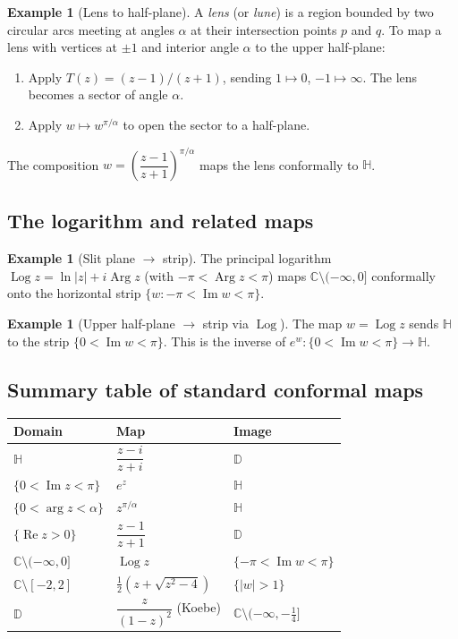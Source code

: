 \documentclass[12pt,a4paper,openany]{book}
\theoremstyle{definition}
\newtheorem{example}[definition]{Example}
\theoremstyle{plain}
\theoremstyle{remark}
\newcommand{\C}{\mathbb{C}}
\newcommand{\D}{\mathbb{D}}
\DeclareMathOperator{\re}{Re}
\DeclareMathOperator{\im}{Im}
\DeclareMathOperator{\Arg}{Arg}
\DeclareMathOperator{\Log}{Log}
\newcommand{\abs}[1]{\left|#1\right|}
\begin{document}
\begin{example}[Lens to half-plane]\label{ex:lens}
A \emph{lens} (or \emph{lune}) is a region bounded by two circular arcs
meeting at angles $\alpha$ at their intersection points $p$ and $q$.
To map a lens with vertices at $\pm 1$ and interior angle $\alpha$ to
the upper half-plane:
\begin{enumerate}[label=(\arabic*)]
  \item Apply $T(z)=(z-1)/(z+1)$, sending $1\mapsto 0$,
        $-1\mapsto\infty$.  The lens becomes a sector of angle $\alpha$.
  \item Apply $w\mapsto w^{\pi/\alpha}$ to open the sector to a
        half-plane.
\end{enumerate}
The composition
$w=\left(\dfrac{z-1}{z+1}\right)^{\!\pi/\alpha}$
maps the lens conformally to $\mathbb{H}$.
\end{example}

\subsection{The logarithm and related maps}

\begin{example}[Slit plane $\to$ strip]\label{ex:log-map}
The principal logarithm $\Log z=\ln\abs{z}+i\Arg z$ (with $-\pi<\Arg z
<\pi$) maps $\C\setminus(-\infty,0]$ conformally onto the horizontal
strip $\{w:-\pi<\im w<\pi\}$.
\end{example}

\begin{example}[Upper half-plane $\to$ strip via $\Log$]\label{ex:log-H-to-strip}
The map $w=\Log z$ sends $\mathbb{H}$ to the strip $\{0<\im w<\pi\}$.
This is the inverse of $e^w:\{0<\im w<\pi\}\to\mathbb{H}$.
\end{example}

\subsection{Summary table of standard conformal maps}

\begin{center}
\renewcommand{\arraystretch}{1.5}
\begin{tabular}{lll}
\toprule
\textbf{Domain} & \textbf{Map} & \textbf{Image} \\
\midrule
$\mathbb{H}$ & $\dfrac{z-i}{z+i}$ & $\D$ \\[6pt]
$\{0<\im z<\pi\}$ & $e^z$ & $\mathbb{H}$ \\[4pt]
$\{0<\arg z<\alpha\}$ & $z^{\pi/\alpha}$ & $\mathbb{H}$ \\[4pt]
$\{\re z>0\}$ & $\dfrac{z-1}{z+1}$ & $\D$ \\[6pt]
$\C\setminus(-\infty,0]$ & $\Log z$ & $\{-\pi<\im w<\pi\}$ \\[4pt]
$\C\setminus[-2,2]$ & $\frac{1}{2}(z+\sqrt{z^2-4})$ & $\{\abs{w}>1\}$ \\[4pt]
$\D$ & $\dfrac{z}{(1-z)^2}$ (Koebe) & $\C\setminus(-\infty,-\tfrac{1}{4}]$ \\
\bottomrule
\end{tabular}
\end{center}
\end{document}
